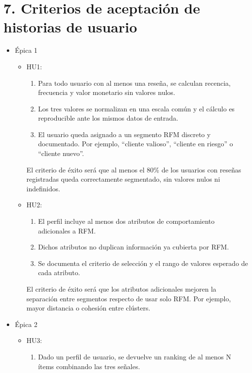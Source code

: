 \documentclass[
11pt, %
]{charter}
\begin{document}
\section{7. Criterios de aceptación de historias de usuario}
\label{sec:criteriosAceptacion}

\begin{itemize}
  \item \'{E}pica 1
    \begin{itemize}
      \item HU1:
        \begin{enumerate}[label=(\alph*)]
          \item Para todo usuario con al menos una reseña, se calculan recencia, frecuencia y valor monetario sin valores nulos.
          \item Los tres valores se normalizan en una escala común y el cálculo es reproducible ante los mismos datos de entrada.
          \item El usuario queda asignado a un segmento RFM discreto y documentado. Por ejemplo, ``cliente valioso'', ``cliente en riesgo'' o ``cliente nuevo''.
        \end{enumerate}
        El criterio de éxito será que al menos el 80\% de los usuarios con reseñas registradas queda correctamente segmentado, sin valores nulos ni indefinidos.
      \item HU2:
        \begin{enumerate}[label=(\alph*)]
          \item El perfil incluye al menos dos atributos de comportamiento adicionales a RFM.
          \item Dichos atributos no duplican información ya cubierta por RFM.
          \item Se documenta el criterio de selección y el rango de valores esperado de cada atributo.
        \end{enumerate}
        El criterio de éxito será que los atributos adicionales mejoren la separación entre segmentos respecto de usar solo RFM. Por ejemplo, mayor distancia o cohesión entre clústers.
    \end{itemize}
  \item \'{E}pica 2
    \begin{itemize}
      \item HU3:
        \begin{enumerate}[label=(\alph*)]
          \item Dado un perfil de usuario, se devuelve un ranking de al menos N ítems combinando las tres señales.

\end{enumerate}
\end{itemize}
\end{itemize}
\end{document}
